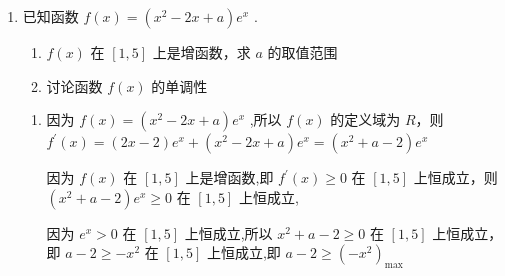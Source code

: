\begin{enumerate}
\begin{enumerate}
\begin{jieda}
            因为 ${f}^{\prime }\left( x\right)  =  - {x}^{2} + {2ax}$ ,由 ${f}^{\prime }\left( x\right)  \leq  0$ 在 $\lbrack 0, + \infty )$ 上恒成立,得:
            
            若 $x = 0$ ,则 $0 \leq  0$ ,所以 $a \in  {R}$ ;
            
            若 $x > 0$ ，则 $- {x}^{2} + {2ax} \leq  0 \Longrightarrow  {2a} \leq  x$ ，所以 $a \leq  0$ .
            
            设 $g\left( x\right)  = {ax} - \sin x$ ,则 $g\left( x\right)$ 在 $\left( {-\infty ,0}\right)$ 上单调递减.
            
            由 ${g}^{\prime }\left( x\right)  = a - \cos x \leq  0$ 在 $\left( {-\infty ,0}\right)$ 上恒成立,所以 $a \leq  \cos x,x \in  \left( {-\infty ,0}\right)$ ,所以 $a \leq   - 1$ .
            
            且 $- a - 4 \leq  0 \Longrightarrow  a \geq   - 4$ .
        \end{jieda}
        
        \item 已知函数 $f\left( x\right)  = \left( {{x}^{2} - {2x} + a}\right) {{e}}^{x}$ .
        \begin{enumerate}
            \item $f\left( x\right)$ 在 $\left\lbrack  {1,5}\right\rbrack$ 上是增函数，求 $a$ 的取值范围
            \item 讨论函数 $f\left( x\right)$ 的单调性
        \end{enumerate}
        \begin{jieda}
            \begin{enumerate}
                \item 因为 $f\left( x\right)  = \left( {{x}^{2} - {2x} + a}\right) {{e}}^{x}$ ,所以 $f\left( x\right)$ 的定义域为 ${R}$，则 ${f}^{\prime }\left( x\right)  = \left( {{2x} - 2}\right) {{e}}^{x} + \left( {{x}^{2} - {2x} + a}\right) {{e}}^{x} = \left( {{x}^{2} + a - 2}\right) {{e}}^{x}$
                
                因为 $f\left( x\right)$ 在 $\left\lbrack  {1,5}\right\rbrack$ 上是增函数,即 ${f}^{\prime }\left( x\right)  \geq  0$ 在 $\left\lbrack  {1,5}\right\rbrack$ 上恒成立，则 $\left( {{x}^{2} + a - 2}\right) {{e}}^{x} \geq  0$ 在 $\left\lbrack  {1,5}\right\rbrack$ 上恒成立,
                
                因为 ${{e}}^{x} > 0$ 在 $\left\lbrack  {1,5}\right\rbrack$ 上恒成立,所以 ${x}^{2} + a - 2 \geq  0$ 在 $\left\lbrack  {1,5}\right\rbrack$ 上恒成立，即 $a - 2 \geq   - {x}^{2}$ 在 $\left\lbrack  {1,5}\right\rbrack$ 上恒成立,即 $a - 2 \geq  {\left( -{x}^{2}\right) }_{\max }$
                

\end{enumerate}
\end{jieda}
\end{enumerate}
\end{enumerate}
